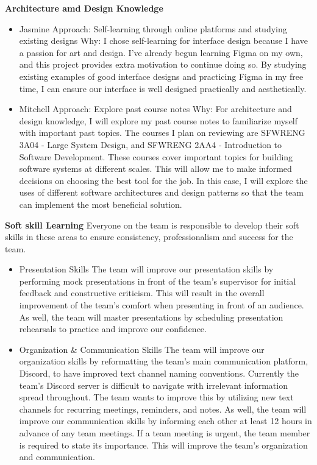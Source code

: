 \documentclass[12pt]{article}
\begin{document}
\begin{enumerate}
  \textbf{Architecture amd Design Knowledge} 
  \begin{itemize}
    \item Jasmine 
    \subitem Approach: Self-learning through online platforms and studying existing designs
    \subitem Why: I chose self-learning for interface design because I have a passion for art and design. I’ve already begun learning Figma on my own, and this project provides extra motivation to continue doing so. By studying existing examples of good interface designs and practicing Figma in my free time, I can ensure our interface is well designed practically and aesthetically.
    \item Mitchell 
    \subitem Approach: Explore past course notes
    \subitem Why: For architecture and design knowledge, I will explore my past course notes to familiarize myself with important past topics. The courses I plan on reviewing are SFWRENG 3A04 - Large System Design, and SFWRENG 2AA4 - Introduction to Software Development. These courses cover important topics for building software systems at different scales. This will allow me to make informed decisions on choosing the best tool for the job. In this case, I will explore the uses of different software architectures and design patterns so that the team can implement the most beneficial solution. 
  \end{itemize}
  \textbf{Soft skill Learning}
  Everyone on the team is responsible to develop their soft skills in these areas to ensure consistency, professionalism and success for the team.
  \begin{itemize}
    \item Presentation Skills
    \subitem The team will improve our presentation skills by performing mock presentations in front of the team's supervisor for initial feedback and constructive criticism. This will result in the overall improvement of the team's comfort when presenting in front of an audience. As well, the team will master presentations by scheduling presentation rehearsals to practice and improve our confidence.
    
    \item Organization \& Communication Skills
    \subitem The team will improve our organization skills by reformatting the team's main communication platform, Discord, to have improved text channel naming conventions. Currently the team's Discord server is difficult to navigate with irrelevant information spread throughout. The team wants to improve this by utilizing new text channels for recurring meetings, reminders, and notes. As well, the team will improve our communication skills by informing each other at least 12 hours in advance of any team meetings. If a team meeting is urgent, the team member is required to state its importance. This will improve the team's organization and communication. 


\end{itemize}
\end{enumerate}
\end{document}
